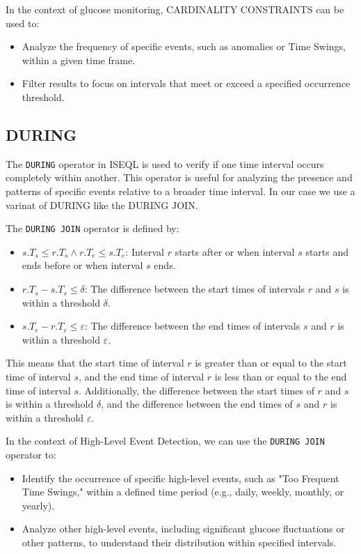 \documentclass{article}
\begin{document}
In the context of glucose monitoring, CARDINALITY CONSTRAINTS can be used to:
\begin{itemize}
    \item Analyze the frequency of specific events, such as anomalies or Time Swings, within a given time frame.
    \item Filter results to focus on intervals that meet or exceed a specified occurrence threshold.
\end{itemize}

\subsection{DURING}

The \texttt{DURING} operator in ISEQL is used to verify if one time interval occurs completely within another. This operator is useful for analyzing the presence and patterns of specific events relative to a broader time interval. In our case we use a varinat of DURING like the DURING JOIN.

The \texttt{DURING JOIN} operator is defined by:
\begin{itemize}
\item $s.T_s \le r.T_s \land r.T_e \le s.T_e$: Interval $r$ starts after or when interval $s$ starts and ends before or when interval $s$ ends.
\item $r.T_s - s.T_s \le \delta$: The difference between the start times of intervals $r$ and $s$ is within a threshold $\delta$.
\item $s.T_e - r.T_e \le \varepsilon$: The difference between the end times of intervals $s$ and $r$ is within a threshold $\varepsilon$.
\end{itemize}

This means that the start time of interval $r$ is greater than or equal to the start time of interval $s$, and the end time of interval $r$ is less than or equal to the end time of interval $s$. Additionally, the difference between the start times of $r$ and $s$ is within a threshold $\delta$, and the difference between the end times of $s$ and $r$ is within a threshold $\varepsilon$.

In the context of High-Level Event Detection, we can use the \texttt{DURING JOIN} operator to:
\begin{itemize}
    \item Identify the occurrence of specific high-level events, such as "Too Frequent Time Swings," within a defined time period (e.g., daily, weekly, monthly, or yearly).
    \item Analyze other high-level events, including significant glucose fluctuations or other patterns, to understand their distribution within specified intervals.
\end{itemize}
\end{document}
